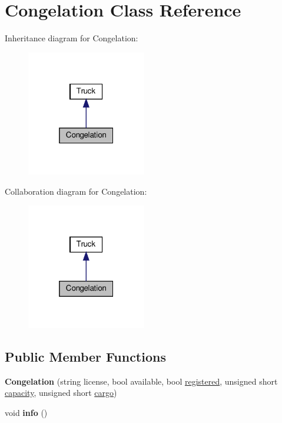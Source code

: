\hypertarget{class_congelation}{}\section{Congelation Class Reference}
\label{class_congelation}


Inheritance diagram for Congelation\+:\nopagebreak
\begin{figure}[H]
\begin{center}
\leavevmode
\includegraphics[width=148pt]{class_congelation__inherit__graph}
\end{center}
\end{figure}


Collaboration diagram for Congelation\+:\nopagebreak
\begin{figure}[H]
\begin{center}
\leavevmode
\includegraphics[width=148pt]{class_congelation__coll__graph}
\end{center}
\end{figure}
\subsection*{Public Member Functions}
\begin{DoxyCompactItemize}
\item 
\mbox{\label{class_congelation_a320f8a45809dbe0d770f9f77d49b3629}} 
{\bfseries Congelation} (string license, bool available, bool \hyperlink{class_truck_a80b8405cf7a15b236fef70116f99c4fb}{registered}, unsigned short \hyperlink{class_truck_a14541fad6d47c606ce4e1bd150a68a23}{capacity}, unsigned short \hyperlink{class_truck_a968fc6b1a6171a03e4254d6615da4ecd}{cargo})
\item 
\mbox{\label{class_congelation_ac2f7cb9aeeeb9428a9a973e6a2c63942}} 
void {\bfseries info} ()
\end{DoxyCompactItemize}
